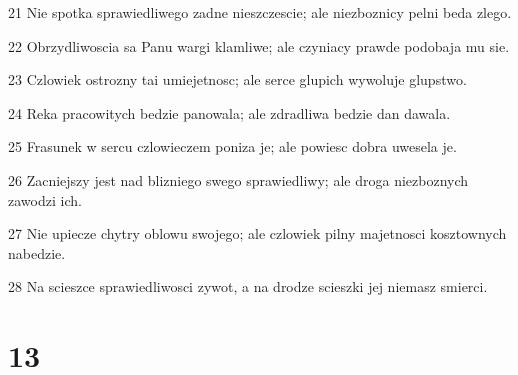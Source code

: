 \par 21 Nie spotka sprawiedliwego zadne nieszczescie; ale niezboznicy pelni beda zlego.
\par 22 Obrzydliwoscia sa Panu wargi klamliwe; ale czyniacy prawde podobaja mu sie.
\par 23 Czlowiek ostrozny tai umiejetnosc; ale serce glupich wywoluje glupstwo.
\par 24 Reka pracowitych bedzie panowala; ale zdradliwa bedzie dan dawala.
\par 25 Frasunek w sercu czlowieczem poniza je; ale powiesc dobra uwesela je.
\par 26 Zacniejszy jest nad blizniego swego sprawiedliwy; ale droga niezboznych zawodzi ich.
\par 27 Nie upiecze chytry oblowu swojego; ale czlowiek pilny majetnosci kosztownych nabedzie.
\par 28 Na scieszce sprawiedliwosci zywot, a na drodze scieszki jej niemasz smierci.

\chapter{13}

